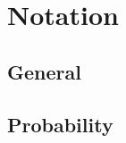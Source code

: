 \documentclass[10pt,twoside,a4paper]{report}
\begin{document}
\section*{Notation}

\subsection*{General}


\subsection*{Probability}

\end{document}

